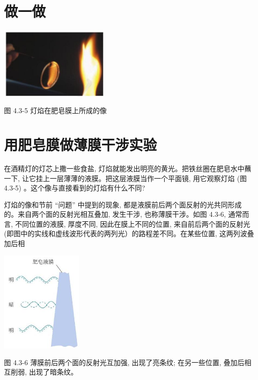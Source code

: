 \documentclass[10pt]{article}
\begin{document}
\section*{做一做}

\begin{center}
\includegraphics[max width=0.4\textwidth]{images/01910e4c-ebb8-7d2c-8f2f-2375bc1d2d12_103_417125.jpg}
\end{center}

图 4.3-5 灯焰在肥皂膜上所成的像

\section*{用肥皂膜做薄膜干涉实验}

在酒精灯的灯芯上撒一些食盐, 灯焰就能发出明亮的黄光。把铁丝圈在肥皂水中蘸一下, 让它挂上一层薄薄的液膜。把这层液膜当作一个平面镜, 用它观察灯焰 (图 4.3-5) 。这个像与直接看到的灯焰有什么不同?

灯焰的像和节前 “问题” 中提到的现象, 都是液膜前后两个面反射的光共同形成的。来自两个面的反射光相互叠加, 发生干涉, 也称薄膜干涉。如图 4.3-6, 通常而言, 不同位置的液膜, 厚度不同, 因此在膜上不同的位置, 来自前后两个面的反射光 (即图中的实线和虚线波形代表的两列光）的路程差不同。在某些位置, 这两列波叠加后相

\begin{mdframed}

\begin{center}
\includegraphics[max width=0.3\textwidth]{images/01910e4c-ebb8-7d2c-8f2f-2375bc1d2d12_104_820542.jpg}
\end{center}

图 4.3-6 薄膜前后两个面的反射光互加强, 出现了亮条纹; 在另一些位置, 叠加后相互削弱, 出现了暗条纹。

\end{mdframed}
\end{document}
